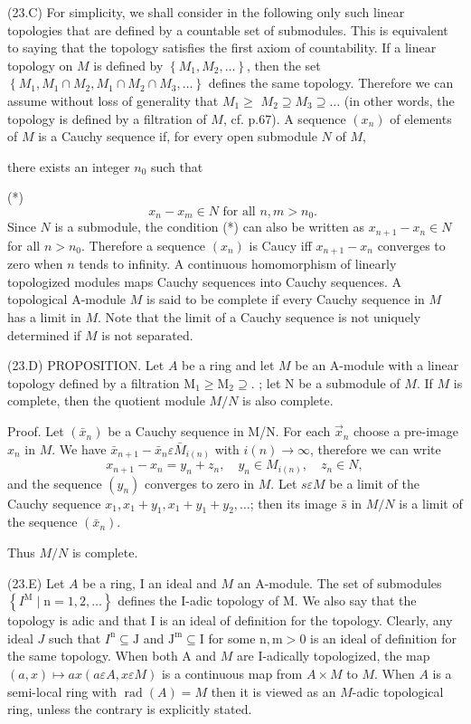 (23.C) For simplicity, we shall consider in the following only such linear topologies that are defined by a countable set of submodules. This is equivalent to saying that the topology satisfies the first axiom of countability. If a linear topology on $M$ is defined by $\left\{M_{1}, M_{2}, \ldots\right\}$, then the set $\left\{M_{1}, M_{1} \cap M_{2}, M_{1} \cap M_{2} \cap M_{3}, \ldots\right\}$ defines the same topology. Therefore we can assume without loss of generality that $M_{1} \geq$ $M_{2} \supseteq M_{3} \supseteq \ldots$ (in other words, the topology is defined by a filtration of $M$, cf. p.67). A sequence $\left(x_{n}\right)$ of elements of $M$ is a Cauchy sequence if, for every open submodule $N$ of $M$,

there exists an integer $n_{0}$ such that

(*)
$$
x_{n}-x_{m} \in N \text { for all } n, m>n_{0} \text {. }
$$
Since $N$ is a submodule, the condition (*) can also be written as $x_{n+1}-x_{n} \in N$ for all $n>n_{0}$. Therefore a sequence $\left(x_{n}\right)$ is Caucy iff $x_{n+1}-x_{n}$ converges to zero when $n$ tends to infinity. A continuous homomorphism of linearly topologized modules maps Cauchy sequences into Cauchy sequences. A topological A-module $M$ is said to be complete if every Cauchy sequence in $M$ has a limit in $M$. Note that the limit of a Cauchy sequence is not uniquely determined if $M$ is not separated.

(23.D) PROPOSITION. Let $A$ be a ring and let $M$ be an A-module with a linear topology defined by a filtration $\mathrm{M}_{1} \geq \mathrm{M}_{2} \supseteq$. ; let $\mathrm{N}$ be a submodule of $M$. If $M$ is complete, then the quotient module $M / N$ is also complete.

Proof. Let $\left(\bar{x}_{n}\right)$ be a Cauchy sequence in M/N. For each $\vec{x}_{n}$ choose a pre-image $x_{n}$ in $M$. We have $\bar{x}_{n+1}-\bar{x}_{n} \varepsilon \bar{M}_{i(n)}$ with $i(n) \rightarrow \infty$, therefore we can write
$$
x_{n+1}-x_{n}=y_{n}+z_{n}, \quad y_{n} \in M_{i(n)}, \quad z_{n} \in N,
$$
and the sequence $\left(y_{n}\right)$ converges to zero in $M$. Let $s \varepsilon M$ be a limit of the Cauchy sequence $x_{1}, x_{1}+y_{1}, x_{1}+y_{1}+y_{2}, \ldots$; then its image $\bar{s}$ in $M / N$ is a limit of the sequence $\left(\bar{x}_{n}\right)$.

Thus $M / N$ is complete.

(23.E) Let $A$ be a ring, I an ideal and $M$ an A-module. The set of submodules $\left\{I^{\mathrm{M}} \mid \mathrm{n}=1,2, \ldots\right\}$ defines the I-adic topology of M. We also say that the topology is adic and that I is an ideal of definition for the topology. Clearly, any ideal $J$ such that $I^{\mathrm{n}} \subseteq \mathrm{J}$ and $\mathrm{J}^{\mathrm{m}} \subseteq \mathrm{I}$ for some $\mathrm{n}, \mathrm{m}>0$ is an ideal of definition for the same topology. When both A and $M$ are I-adically topologized, the map $(a, x) \longmapsto a x(a \varepsilon A, x \varepsilon M)$ is a continuous map from $A \times M$ to $M .$ When $A$ is a semi-local ring with $\operatorname{rad}(A)=M$ then it is viewed as an $M$-adic topological ring, unless the contrary is explicitly stated.

